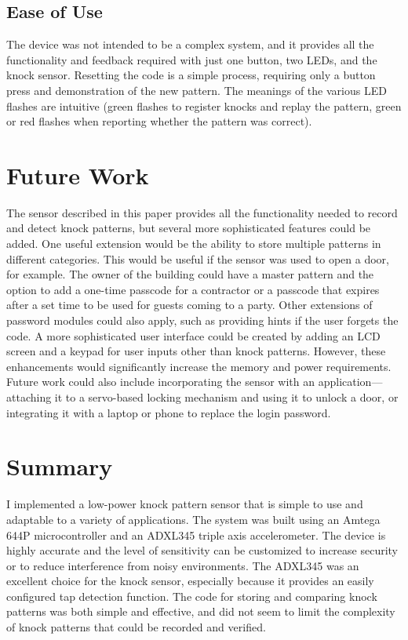 \documentclass[conference]{./IEEEtran}
\begin{document}
\subsection{Ease of Use}
The device was not intended to be a complex system, and it provides all the functionality and feedback required with just one button, two LEDs, and the knock sensor. Resetting the code is a simple process, requiring only a button press and demonstration of the new pattern. The meanings of the various LED flashes are intuitive (green flashes to register knocks and replay the pattern, green or red flashes when reporting whether the pattern was correct). 

\section{Future Work}
The sensor described in this paper provides all the functionality needed to record and detect knock patterns, but several more sophisticated features could be added. One useful extension would be the ability to store multiple patterns in different categories. This would be useful if the sensor was used to open a door, for example. The owner of the building could have a master pattern and the option to add a one-time passcode for a contractor or a passcode that expires after a set time to be used for guests coming to a party. Other extensions of password modules could also apply, such as providing hints if the user forgets the code. A more sophisticated user interface could be created by adding an LCD screen and a keypad for user inputs other than knock patterns. However, these enhancements would significantly increase the memory and power requirements. Future work could also include incorporating the sensor with an application---attaching it to a servo-based locking mechanism and using it to unlock a door, or integrating it with a laptop or phone to replace the login password. 

\section{Summary}
I implemented a low-power knock pattern sensor that is simple to use and adaptable to a variety of applications. The system was built using an Amtega 644P microcontroller and an ADXL345 triple axis accelerometer. The device is highly accurate and the level of sensitivity can be customized to increase security or to reduce interference from noisy environments. The ADXL345 was an excellent choice for the knock sensor, especially because it provides an easily configured tap detection function. The code for storing and comparing knock patterns was both simple and effective, and did not seem to limit the complexity of knock patterns that could be recorded and verified.





\end{document}
